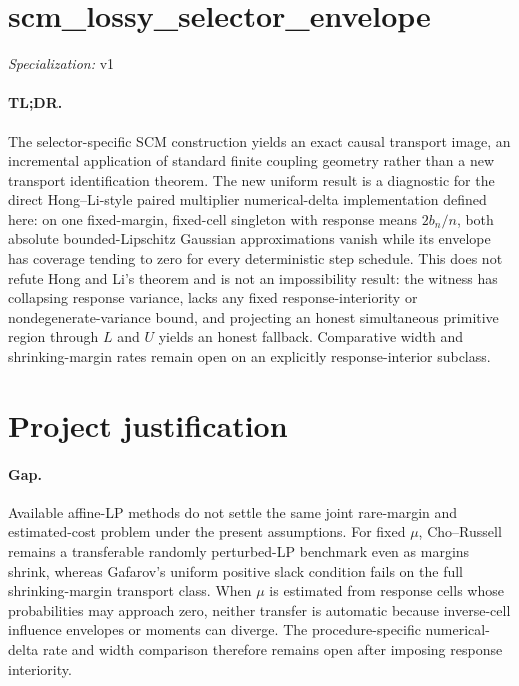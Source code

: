 \documentclass{article}
\begin{document}
\sloppy

\section*{scm\_\allowbreak{}lossy\_\allowbreak{}selector\_\allowbreak{}envelope}

\noindent\textit{Specialization:} v1\par

\paragraph{TL;DR.} The selector-specific SCM construction yields an exact causal transport image, an incremental application of standard finite coupling geometry rather than a new transport identification theorem. The new uniform result is a diagnostic for the direct Hong--Li-style paired multiplier numerical-delta implementation defined here: on one fixed-margin, fixed-cell singleton with response means \(2b_n/n\), both absolute bounded-Lipschitz Gaussian approximations vanish while its envelope has coverage tending to zero for every deterministic step schedule. This does not refute Hong and Li's theorem and is not an impossibility result: the witness has collapsing response variance, lacks any fixed response-interiority or nondegenerate-variance bound, and projecting an honest simultaneous primitive region through \(L\) and \(U\) yields an honest fallback. Comparative width and shrinking-margin rates remain open on an explicitly response-interior subclass.

\section{Project justification}

\paragraph{Gap.} Available affine-LP methods do not settle the same joint rare-margin and estimated-cost problem under the present assumptions. For fixed \(\mu\), Cho--Russell remains a transferable randomly perturbed-LP benchmark even as margins shrink, whereas Gafarov's uniform positive slack condition fails on the full shrinking-margin transport class. When \(\mu\) is estimated from response cells whose probabilities may approach zero, neither transfer is automatic because inverse-cell influence envelopes or moments can diverge. The procedure-specific numerical-delta rate and width comparison therefore remains open after imposing response interiority.
\end{document}
